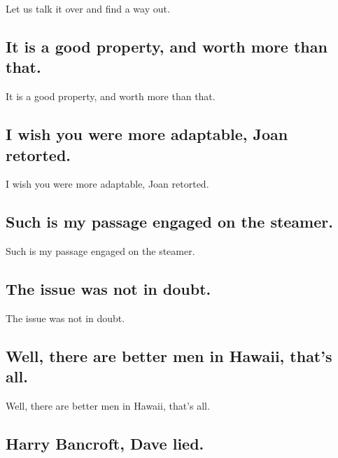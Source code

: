\documentclass[]{article}
\begin{document}
Let us talk it over and find a way out.

\hypertarget{it-is-a-good-property-and-worth-more-than-that.}{%
\subsection{It is a good property, and worth more than
that.}\label{it-is-a-good-property-and-worth-more-than-that.}}

It is a good property, and worth more than that.

\hypertarget{i-wish-you-were-more-adaptable-joan-retorted.}{%
\subsection{I wish you were more adaptable, Joan
retorted.}\label{i-wish-you-were-more-adaptable-joan-retorted.}}

I wish you were more adaptable, Joan retorted.

\hypertarget{such-is-my-passage-engaged-on-the-steamer.}{%
\subsection{Such is my passage engaged on the
steamer.}\label{such-is-my-passage-engaged-on-the-steamer.}}

Such is my passage engaged on the steamer.

\hypertarget{the-issue-was-not-in-doubt.}{%
\subsection{The issue was not in
doubt.}\label{the-issue-was-not-in-doubt.}}

The issue was not in doubt.

\hypertarget{well-there-are-better-men-in-hawaii-thats-all.}{%
\subsection{Well, there are better men in Hawaii, that's
all.}\label{well-there-are-better-men-in-hawaii-thats-all.}}

Well, there are better men in Hawaii, that's all.

\hypertarget{harry-bancroft-dave-lied.}{%
\subsection{Harry Bancroft, Dave
lied.}\label{harry-bancroft-dave-lied.}}
\end{document}
